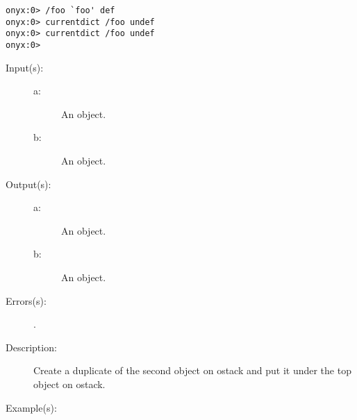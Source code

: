 \begin{description}
\begin{description}
\begin{verbatim}
onyx:0> /foo `foo' def
onyx:0> currentdict /foo undef
onyx:0> currentdict /foo undef
onyx:0>
		\end{verbatim}
	\end{description}
\label{systemdict:under}
\item[{\onyxop{a b}{under}{a a b}}: ]
	\begin{description}\item[]
	\item[Input(s): ]
		\begin{description}\item[]
		\item[a: ]
			An object.
		\item[b: ]
			An object.
		\end{description}
	\item[Output(s): ]
		\begin{description}\item[]
		\item[a: ]
			An object.
		\item[b: ]
			An object.
		\end{description}
	\item[Errors(s): ]
		\begin{description}\item[]
		\item[.]
		\end{description}
	\item[Description: ]
		Create a duplicate of the second object on ostack and put it
		under the top object on ostack.
	\item[Example(s): ]\begin{verbatim}


\end{verbatim}
\end{description}
\end{description}
